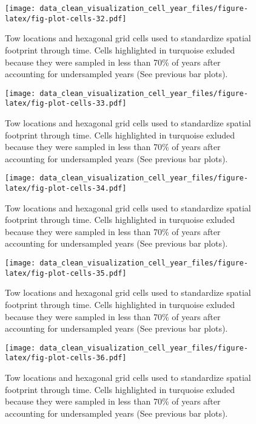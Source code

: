 \documentclass[
]{article}
\begin{document}
\begin{figure}
\centering
\texttt{[image: data\_clean\_visualization\_cell\_year\_files/figure-latex/fig-plot-cells-32.pdf]}
\caption{\label{fig:fig-plot-cells-32}Tow locations and hexagonal grid cells used to standardize spatial footprint through time. Cells highlighted in turquoise exluded because they were sampled in less than 70\% of years after accounting for undersampled years (See previous bar plots).}
\end{figure}

\begin{figure}
\centering
\texttt{[image: data\_clean\_visualization\_cell\_year\_files/figure-latex/fig-plot-cells-33.pdf]}
\caption{\label{fig:fig-plot-cells-33}Tow locations and hexagonal grid cells used to standardize spatial footprint through time. Cells highlighted in turquoise exluded because they were sampled in less than 70\% of years after accounting for undersampled years (See previous bar plots).}
\end{figure}

\begin{figure}
\centering
\texttt{[image: data\_clean\_visualization\_cell\_year\_files/figure-latex/fig-plot-cells-34.pdf]}
\caption{\label{fig:fig-plot-cells-34}Tow locations and hexagonal grid cells used to standardize spatial footprint through time. Cells highlighted in turquoise exluded because they were sampled in less than 70\% of years after accounting for undersampled years (See previous bar plots).}
\end{figure}

\begin{figure}
\centering
\texttt{[image: data\_clean\_visualization\_cell\_year\_files/figure-latex/fig-plot-cells-35.pdf]}
\caption{\label{fig:fig-plot-cells-35}Tow locations and hexagonal grid cells used to standardize spatial footprint through time. Cells highlighted in turquoise exluded because they were sampled in less than 70\% of years after accounting for undersampled years (See previous bar plots).}
\end{figure}

\begin{figure}
\centering
\texttt{[image: data\_clean\_visualization\_cell\_year\_files/figure-latex/fig-plot-cells-36.pdf]}
\caption{\label{fig:fig-plot-cells-36}Tow locations and hexagonal grid cells used to standardize spatial footprint through time. Cells highlighted in turquoise exluded because they were sampled in less than 70\% of years after accounting for undersampled years (See previous bar plots).}
\end{figure}
\end{document}
